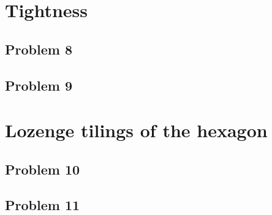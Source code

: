 \documentclass[12pt]{article}
\begin{document}
\section{Tightness}

	\subsection*{Problem 8}
	
	\subsection*{Problem 9}


\section{Lozenge tilings of the hexagon}

	\subsection*{Problem 10}
	
	\subsection*{Problem 11}
\end{document}
